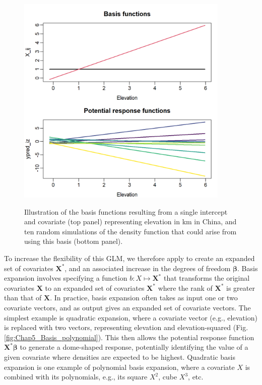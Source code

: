 \begin{figure}[!ht]
    \caption[Linear model basis functions]{Illustration of the basis functions resulting from a single intercept and covariate (top panel) representing elevation in km in China, and ten random simulations of the density function that could arise from using this basis (bottom panel).}
    \centering
    \includegraphics[width=4in]{Chap_5/Basis-linear.png}
    \label{fig:Chap5_Basis_linear}
\end{figure}

To increase the flexibility of this GLM, we therefore apply  to create an expanded set of covariates \( \mathbf{X}^* \), and an associated increase in the degrees of freedom \( \mathbf{\beta} \).  Basis expansion involves specifying a function \(b : X \mapsto \mathbf X^*\) that transforms the original covariates \(\mathbf{X}\) to an expanded set of covariates \(\mathbf{X}^*\) where the rank of \( \mathbf X^*\) is greater than that of \( \mathbf{X}\).  In practice, basis expansion often takes as input one or two covariate vectors, and as output gives an expanded set of covariate vectors.  The simplest example is quadratic expansion, where a covariate vector (e.g., elevation) is replaced with two vectors, representing elevation and elevation-squared (Fig. \ref{fig:Chap5_Basis_polynomial}).  This then allows the potential response function \( \mathbf{X^* \beta} \) to generate a dome-shaped response, potentially identifying the value of a given covariate where densities are expected to be highest.  Quadratic basis expansion is one example of polynomial basis expansion, where a covariate \(X\) is combined with its polynomials, e.g., its square \(X^2\), cube \(X^3\), etc.   

